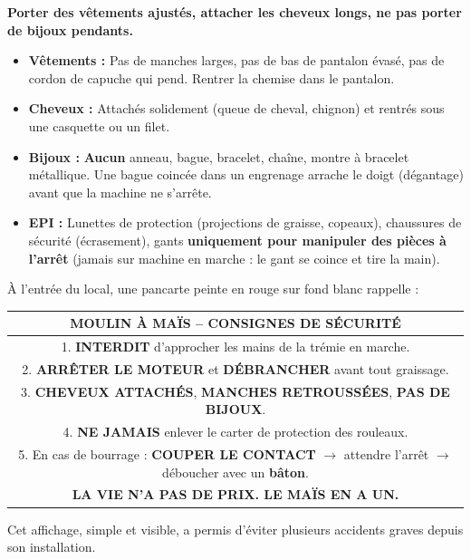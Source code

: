 \documentclass[11pt]{article}
\begin{document}
\begin{propriete}
\textbf{Porter des vêtements ajustés, attacher les cheveux longs, ne pas porter de bijoux pendants.}
\begin{itemize}
    \item \textbf{Vêtements :} Pas de manches larges, pas de bas de pantalon évasé, pas de cordon de capuche qui pend. Rentrer la chemise dans le pantalon.
    \item \textbf{Cheveux :} Attachés solidement (queue de cheval, chignon) et rentrés sous une casquette ou un filet.
    \item \textbf{Bijoux :} \textbf{Aucun} anneau, bague, bracelet, chaîne, montre à bracelet métallique. Une bague coincée dans un engrenage arrache le doigt (dégantage) avant que la machine ne s'arrête.
    \item \textbf{EPI :} Lunettes de protection (projections de graisse, copeaux), chaussures de sécurité (écrasement), gants \textbf{uniquement pour manipuler des pièces à l'arrêt} (jamais sur machine en marche : le gant se coince et tire la main).
\end{itemize}
\end{propriete}

\begin{exemplebox}
À l'entrée du local, une pancarte peinte en rouge sur fond blanc rappelle :
\begin{center}
\begin{tabular}{|c|}\hline
\textbf{MOULIN À MAÏS – CONSIGNES DE SÉCURITÉ} \\ \hline
1. \textbf{INTERDIT} d'approcher les mains de la trémie en marche. \\ \hline
2. \textbf{ARRÊTER LE MOTEUR} et \textbf{DÉBRANCHER} avant tout graissage. \\ \hline
3. \textbf{CHEVEUX ATTACHÉS}, \textbf{MANCHES RETROUSSÉES}, \textbf{PAS DE BIJOUX}. \\ \hline
4. \textbf{NE JAMAIS} enlever le carter de protection des rouleaux. \\ \hline
5. En cas de bourrage : \textbf{COUPER LE CONTACT} $\rightarrow$ attendre l'arrêt $\rightarrow$ déboucher avec un \textbf{bâton}. \\ \hline
\textbf{LA VIE N'A PAS DE PRIX. LE MAÏS EN A UN.} \\ \hline
\end{tabular}
\end{center}
Cet affichage, simple et visible, a permis d'éviter plusieurs accidents graves depuis son installation.
\end{exemplebox}
\end{document}
